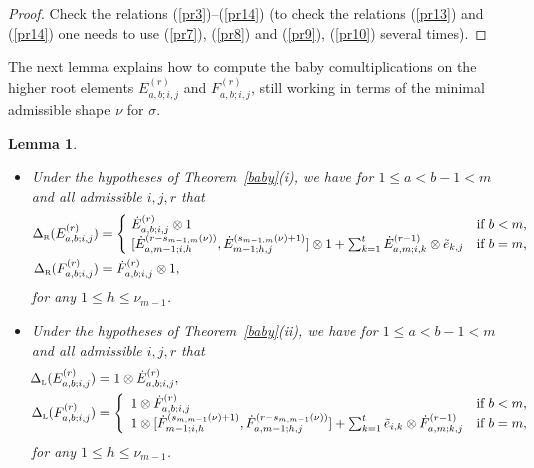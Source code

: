 \documentclass[twoside,12pt,reqno]{amsart}
\newtheorem{Lemma}[Proposition]{Lemma}
\def\rt{{\operatorname{\scriptscriptstyle R}}}
\def\lt{{\operatorname{\scriptscriptstyle L}}}
\begin{document}
\begin{proof}
Check the relations (\ref{pr3})--(\ref{pr14})
(to check the relations (\ref{pr13}) and (\ref{pr14}) one needs to use
(\ref{pr7}), (\ref{pr8}) and (\ref{pr9}), (\ref{pr10}) several times).
\end{proof}

The next lemma explains how to compute the
baby comultiplications on the higher root elements
$E_{a,b;i,j}^{(r)}$ and $F_{a,b;i,j}^{(r)}$, still
working in terms of
the minimal admissible shape $\nu$ for $\sigma$.

\begin{Lemma}\label{higherroots}
\begin{itemize}
\item[(i)] Under the hypotheses of Theorem~\ref{baby}(i),
we have for $1 \leq a < b-1 < m$ and all admissible $i,j,r$ that
\begin{align*}
\Delta_{\rt}(E_{a,b;i,j}^{(r)}) &= \left\{
\begin{array}{ll}
\!\dot E_{a,b;i,j}^{(r)} \otimes 1&\hbox{if $b < m$,}\\
\!{[\dot E_{a,m-1;i,h}^{(r-s_{m-1,m}(\nu))},\dot E_{m-1;h,j}^{(s_{m-1,m}(\nu)+1)}]
\otimes 1+\sum_{k=1}^{t}\dot E_{a,m;i,k}^{(r-1)} \otimes \tilde 
e_{k,j}}&\hbox{if $b = m$,}
\end{array}\right.\\
\Delta_{\rt}(F_{a,b;i,j}^{(r)}) &= \dot F_{a,b;i,j}^{(r)} \otimes 1,
\end{align*}
for any $1 \leq h \leq \nu_{m-1}$.
\item[(ii)] Under the hypotheses of Theorem~\ref{baby}(ii),
we have for $1 \leq a < b-1 < m$ and all admissible $i,j,r$ that
\begin{align*}
\!\Delta_{\lt}(E_{a,b;i,j}^{(r)}) &= 1 \otimes \dot E_{a,b;i,j}^{(r)},\\
\!\Delta_{\lt}(F_{a,b;i,j}^{(r)}) &=
\left\{
\begin{array}{ll}
1 \otimes \dot F_{a,b;i,j}^{(r)}&\hbox{if $b < m$,}\\
1 \otimes [\dot F_{m-1;i,h}^{(s_{m,m-1}(\nu)+1)},\dot F_{a,m-1;h,j}^{(r-s_{m,m-1}(\nu))}]+\sum_{k=1}^{t} \tilde e_{i,k} \otimes \dot F_{a,m;k,j}^{(r-1)}&\hbox{if $b = m$,}
\end{array}\right.
\end{align*}
for any $1 \leq h \leq \nu_{m-1}$.
\end{itemize}
\end{Lemma}
\end{document}
